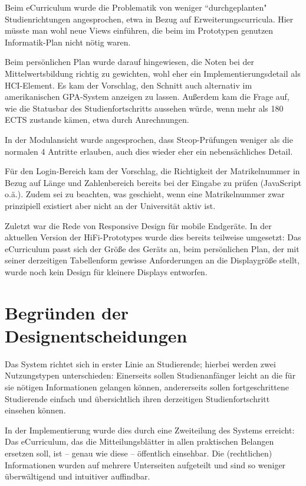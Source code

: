 \documentclass[a4paper,10pt]{scrartcl}
\begin{document}
Beim eCurriculum wurde die Problematik von weniger ``durchgeplanten" Studienrichtungen angesprochen, etwa in Bezug auf Erweiterungscurricula. Hier müsste man wohl neue Views einführen, die beim im Prototypen genutzen Informatik-Plan nicht nötig waren.

Beim persönlichen Plan wurde darauf hingewiesen, die Noten bei der Mittelwertsbildung richtig zu gewichten, wohl eher ein Implementierungsdetail als HCI-Element. Es kam der Vorschlag, den Schnitt auch alternativ im amerikanischen GPA-System anzeigen zu lassen. Außerdem kam die Frage auf, wie die Statusbar des Studienfortschritts aussehen würde, wenn mehr als 180 ECTS zustande kämen, etwa durch Anrechnungen.

In der Modulansicht wurde angesprochen, dass Steop-Prüfungen weniger als die normalen 4 Antritte erlauben, auch dies wieder eher ein nebensächliches Detail.

Für den Login-Bereich kam der Vorschlag, die Richtigkeit der Matrikelnummer in Bezug auf Länge und Zahlenbereich bereits bei der Eingabe zu prüfen (JavaScript o.ä.). Zudem sei zu beachten, was geschieht, wenn eine Matrikelnummer zwar prinzipiell existiert aber nicht an der Universität aktiv ist.

Zuletzt war die Rede von Responsive Design für mobile Endgeräte. In der aktuellen Version der HiFi-Prototypes wurde dies bereits teilweise umgesetzt: Das eCurriculum passt sich der Größe des Geräts an, beim persönlichen Plan, der mit seiner derzeitigen Tabellenform gewisse Anforderungen an die Displaygröße stellt, wurde noch kein Design für kleinere Displays entworfen.

\section{Begründen der Designentscheidungen}
Das System richtet sich in erster Linie an Studierende; hierbei werden zwei Nutzungstypen unterschieden: Einerseits sollen Studienanfänger leicht an die für sie nötigen Informationen gelangen können, andererseits sollen fortgeschrittene Studierende einfach und übersichtlich ihren derzeitigen Studienfortschritt einsehen können.

In der Implementierung wurde dies durch eine Zweiteilung des Systems erreicht: Das eCurriculum, das die Mitteilungsblätter in allen praktischen Belangen ersetzen soll, ist – genau wie diese – öffentlich einsehbar. Die (rechtlichen) Informationen wurden auf mehrere Unterseiten aufgeteilt und sind so weniger überwältigend und intuitiver auffindbar.
\end{document}
